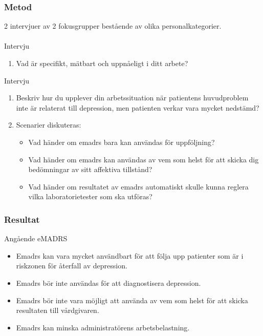\documentclass[english]{beamer}
\begin{document}
\begin{frame}
\frametitle{Metod}
2 intervjuer av 2 fokusgrupper best{\aa}ende av olika personalkategorier.\\\ \\
Intervju {}\vspace{-.33em}
\begin{enumerate}
\item {\bf} Vad {\"a}r specifikt, m{\"a}tbart och uppn{\aa}eligt i ditt arbete?
\end{enumerate}
Intervju {}\vspace{-.33em}
\begin{enumerate}
\item {\bf} Beskriv hur du upplever din arbetssituation n{\"a}r patientens huvudproblem inte {\"a}r relaterat till depression, men patienten verkar vara mycket nedst{\"a}md?\vspace{-.33em}
\item {\bf} Scenarier diskuteras:\vspace{-.33em}
\begin{itemize}\vspace{-.33em}
\item {\bf} Vad h{\"a}nder om e{\sc madrs} bara kan anv{\"a}ndas f{\"or} uppf{\"o}ljning?\vspace{-.33em}
\item {\bf} Vad h{\"a}nder om e{\sc madrs} kan anv{\"a}ndas av vem som helst f{\"o}r att skicka dig bed{\"o}mningar av sitt affektiva tillst{\aa}nd?\vspace{-.33em}
\item {\bf} Vad h{\"a}nder om resultatet av e{\sc madrs} automatiskt skulle kunna reglera vilka laboratorietester som ska utf{\"o}ras?
\end{itemize}
\end{enumerate}
\end{frame}

\begin{frame}
\frametitle{Resultat}
Ang{\aa}ende eMADRS
\begin{itemize}
\item Emadrs kan vara mycket anv{\"a}ndbart f{\"o}r att f{\"o}lja upp patienter som {\"a}r i riskzonen f{\"o}r {\aa}terfall av depression.
\item Emadrs b{\"o}r inte anv{\"a}ndas f{\"o}r att diagnostisera depression.
\item Emadrs b{\"o}r inte vara m{\"o}jligt att anv{\"a}nda av vem som helst f{\"o}r att skicka resultaten till v{\aa}rdgivaren. 
\item Emadrs kan minska administrat{\"o}rens arbetsbelastning. 
\end{itemize}
\end{frame}
\end{document}
